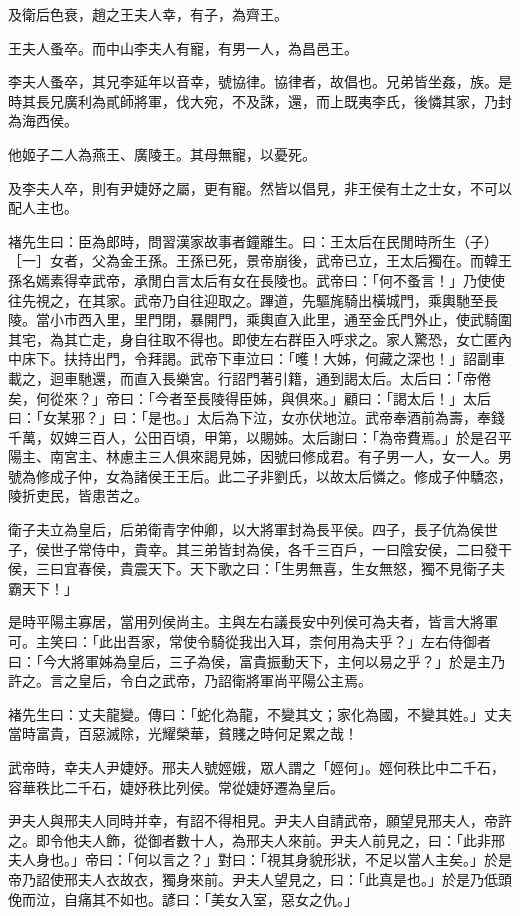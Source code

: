 \begin{pinyinscope}
及衛后色衰，趙之王夫人幸，有子，為齊王。

王夫人蚤卒。而中山李夫人有寵，有男一人，為昌邑王。

李夫人蚤卒，其兄李延年以音幸，號協律。協律者，故倡也。兄弟皆坐姦，族。是時其長兄廣利為貳師將軍，伐大宛，不及誅，還，而上既夷李氏，後憐其家，乃封為海西侯。

他姬子二人為燕王、廣陵王。其母無寵，以憂死。

及李夫人卒，則有尹婕妤之屬，更有寵。然皆以倡見，非王侯有土之士女，不可以配人主也。

褚先生曰：臣為郎時，問習漢家故事者鐘離生。曰：王太后在民閒時所生（子）［一］女者，父為金王孫。王孫已死，景帝崩後，武帝已立，王太后獨在。而韓王孫名嫣素得幸武帝，承閒白言太后有女在長陵也。武帝曰：「何不蚤言！」乃使使往先視之，在其家。武帝乃自往迎取之。蹕道，先驅旄騎出橫城門，乘輿馳至長陵。當小市西入里，里門閉，暴開門，乘輿直入此里，通至金氏門外止，使武騎圍其宅，為其亡走，身自往取不得也。即使左右群臣入呼求之。家人驚恐，女亡匿內中床下。扶持出門，令拜謁。武帝下車泣曰：「嚄！大姊，何藏之深也！」詔副車載之，迴車馳還，而直入長樂宮。行詔門著引籍，通到謁太后。太后曰：「帝倦矣，何從來？」帝曰：「今者至長陵得臣姊，與俱來。」顧曰：「謁太后！」太后曰：「女某邪？」曰：「是也。」太后為下泣，女亦伏地泣。武帝奉酒前為壽，奉錢千萬，奴婢三百人，公田百頃，甲第，以賜姊。太后謝曰：「為帝費焉。」於是召平陽主、南宮主、林慮主三人俱來謁見姊，因號曰修成君。有子男一人，女一人。男號為修成子仲，女為諸侯王王后。此二子非劉氏，以故太后憐之。修成子仲驕恣，陵折吏民，皆患苦之。

衛子夫立為皇后，后弟衛青字仲卿，以大將軍封為長平侯。四子，長子伉為侯世子，侯世子常侍中，貴幸。其三弟皆封為侯，各千三百戶，一曰陰安侯，二曰發干侯，三曰宜春侯，貴震天下。天下歌之曰：「生男無喜，生女無怒，獨不見衛子夫霸天下！」

是時平陽主寡居，當用列侯尚主。主與左右議長安中列侯可為夫者，皆言大將軍可。主笑曰：「此出吾家，常使令騎從我出入耳，柰何用為夫乎？」左右侍御者曰：「今大將軍姊為皇后，三子為侯，富貴振動天下，主何以易之乎？」於是主乃許之。言之皇后，令白之武帝，乃詔衛將軍尚平陽公主焉。

褚先生曰：丈夫龍變。傳曰：「蛇化為龍，不變其文；家化為國，不變其姓。」丈夫當時富貴，百惡滅除，光耀榮華，貧賤之時何足累之哉！

武帝時，幸夫人尹婕妤。邢夫人號娙娥，眾人謂之「娙何」。娙何秩比中二千石，容華秩比二千石，婕妤秩比列侯。常從婕妤遷為皇后。

尹夫人與邢夫人同時并幸，有詔不得相見。尹夫人自請武帝，願望見邢夫人，帝許之。即令他夫人飾，從御者數十人，為邢夫人來前。尹夫人前見之，曰：「此非邢夫人身也。」帝曰：「何以言之？」對曰：「視其身貌形狀，不足以當人主矣。」於是帝乃詔使邢夫人衣故衣，獨身來前。尹夫人望見之，曰：「此真是也。」於是乃低頭俛而泣，自痛其不如也。諺曰：「美女入室，惡女之仇。」


\end{pinyinscope}
